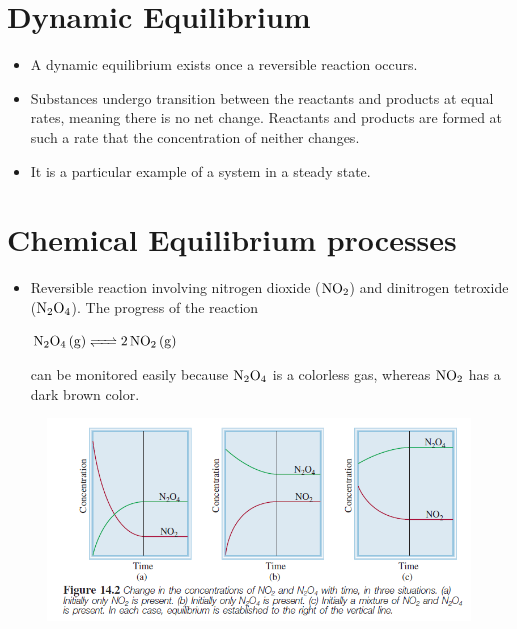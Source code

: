 \documentclass[a4paper,12pt,twocolumn]{article}
\begin{document}
\section{Dynamic Equilibrium}
\begin{itemize}
    \item A dynamic equilibrium exists once a reversible reaction occurs. 
    \item Substances undergo transition between the reactants and products at equal rates, meaning there is no net change. Reactants and products are formed at such a rate that the concentration of neither changes. 
    \item It is a particular example of a system in a steady state.
\end{itemize}

\section{Chemical Equilibrium processes}
\begin{itemize}
    \item Reversible reaction involving nitrogen dioxide ($\ce{NO2}$) and dinitrogen tetroxide ($\ce{N2O4}$). The progress of the reaction
          \begin{center}
            $\ce{N2O4 (g) <=> 2NO2 (g)}$
          \end{center}
          can be monitored easily because $\ce{N2O4}$ is a colorless gas, whereas $\ce{NO2}$ has a dark brown color.\\
\end{itemize}
\begin{figure}[h]
    \centering
    \includegraphics[width=.5\textwidth]{Screenshot 2023-03-22 021052.png}
\end{figure}
\end{document}
